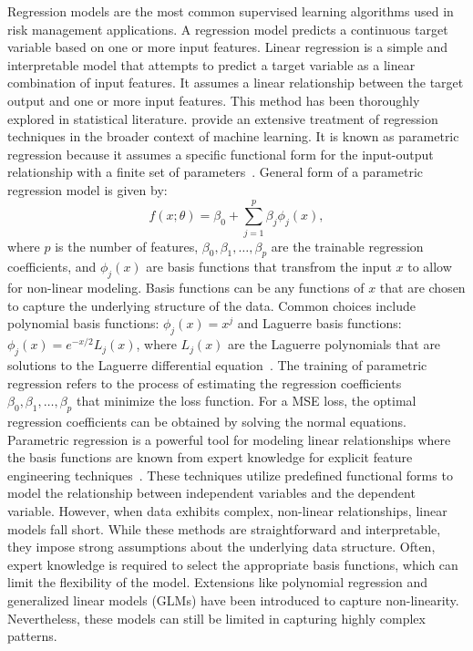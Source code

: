 Regression models are the most common supervised learning algorithms used in risk management applications.
A regression model predicts a continuous target variable based on one or more input features.
Linear regression is a simple and interpretable model that attempts to predict a target variable as a linear combination of input features. 
It assumes a linear relationship between the target output and one or more input features. 
This method has been thoroughly explored in statistical literature. 
\citet{bishop2006pattern} provide an extensive treatment of regression techniques in the broader context of machine learning.
It is known as parametric regression because it assumes a specific functional form for the input-output relationship with a finite set of parameters~\citep{seber2012linear}.
General form of a parametric regression model is given by:
\begin{equation} \label{eq:regression}
    f(x; \theta) = \beta_0 + \sum_{j=1}^{p} \beta_j \phi_j(x),
\end{equation}
where $p$ is the number of features, $\beta_0, \beta_1, \ldots, \beta_p$ are the trainable regression coefficients, and $\phi_j(x)$ are basis functions that transfrom the input $x$ to allow for non-linear modeling.
Basis functions can be any functions of $x$ that are chosen to capture the underlying structure of the data.
Common choices include polynomial basis functions: $\phi_j(x) = x^j$ and Laguerre basis functions: $\phi_j(x) = e^{-x/2} L_j(x)$, where $L_j(x)$ are the Laguerre polynomials that are solutions to the Laguerre differential equation~\citep{szeg1939orthogonal}.
The training of parametric regression refers to the process of estimating the regression coefficients $\beta_0, \beta_1, \ldots, \beta_p$ that minimize the loss function.
For a MSE loss, the optimal regression coefficients can be obtained by solving the normal equations.
Parametric regression is a powerful tool for modeling linear relationships where the basis functions are known from expert knowledge for explicit feature engineering techniques~\citep{hastie2009elements}.
These techniques utilize predefined functional forms to model the relationship between independent variables and the dependent variable. 
However, when data exhibits complex, non-linear relationships, linear models fall short. 
While these methods are straightforward and interpretable, they impose strong assumptions about the underlying data structure.
Often, expert knowledge is required to select the appropriate basis functions, which can limit the flexibility of the model.
Extensions like polynomial regression and generalized linear models (GLMs) have been introduced to capture non-linearity.
Nevertheless, these models can still be limited in capturing highly complex patterns. 

